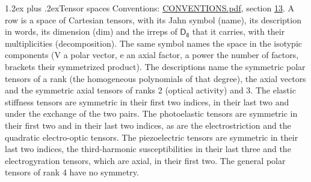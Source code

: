 \documentclass[10pt,a4paper]{article}
\makeatletter
\renewcommand\section{\@startsection{section}{1}{\z@}{-3ex plus -1ex minus -.2ex}%
  {1.2ex plus .2ex}{\normalfont\large\sffamily\bfseries\color{parttitle}}}
\numberwithin{equation}{section}
\newcommand{\grp}[1]{\mathsf{#1}}
\makeatother
\begin{document}
\section{Tensor spaces}\label{s:tensor_spaces}
Conventions: \href{../../CONVENTIONS.pdf}{CONVENTIONS.pdf}, section \href{../../CONVENTIONS.pdf\#conv.13}{13}.
\leavevmode\label{n:head.name}\label{n:head.description}\label{n:head.dim}\label{n:head.decomposition}A row is a space of Cartesian tensors, with its Jahn symbol (name), its description in words, its dimension (dim) and the irreps of $\grp{D_{8}}$ that it carries, with their multiplicities (decomposition). \label{n:label.jahn}The same symbol names the space in the isotypic components (V a polar vector, e an axial factor, a power the number of factors, brackets their symmetrized product). The descriptions name the symmetric polar tensors of a rank (the homogeneous polynomials of that degree), the axial vectors and the symmetric axial tensors of ranks 2 (optical activity) and 3. The elastic stiffness tensors are symmetric in their first two indices, in their last two and under the exchange of the two pairs. The photoelastic tensors are symmetric in their first two and in their last two indices, as are the electrostriction and the quadratic electro-optic tensors. The piezoelectric tensors are symmetric in their last two indices, the third-harmonic susceptibilities in their last three and the electrogyration tensors, which are axial, in their first two. The general polar tensors of rank 4 have no symmetry.
\end{document}
